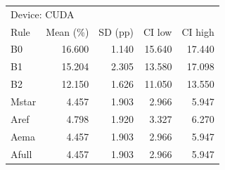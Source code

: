 \begin{tabular}{lrrrr}
\toprule
\multicolumn{5}{l}{Device: CUDA} \\
Rule & Mean (\%) & SD (pp) & CI low & CI high \\
\midrule
B0 & 16.600 & 1.140 & 15.640 & 17.440 \\
B1 & 15.204 & 2.305 & 13.580 & 17.098 \\
B2 & 12.150 & 1.626 & 11.050 & 13.550 \\
Mstar & 4.457 & 1.903 & 2.966 & 5.947 \\
Aref & 4.798 & 1.920 & 3.327 & 6.270 \\
Aema & 4.457 & 1.903 & 2.966 & 5.947 \\
Afull & 4.457 & 1.903 & 2.966 & 5.947 \\
\bottomrule
\end{tabular}
